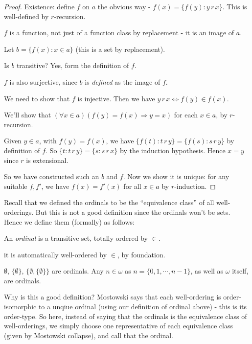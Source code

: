 \documentclass[a4paper]{article}
\begin{document}
\begin{proof}
  Existence: define $f$ on $a$ the obvious way - $f(x) = \{f(y): y\,r\,x\}$. This is well-defined by $r$-recursion.

  \note $f$ is a function, not just of a function class by replacement - it is an image of $a$.

  Let $b = \{f(x): x\in a\}$ (this is a set by replacement).

  Is $b$ transitive? Yes, form the definition of $f$.

  $f$ is also surjective, since $b$ is \emph{defined} as the image of $f$.

  We need to show that $f$ is injective. Then we have $y\, r\, x \Leftrightarrow f(y) \in f(x)$.

  We'll show that $(\forall x\in a)(f(y) = f(x) \Rightarrow  y = x)$ for each $x\in a$, by $r$-recursion.

  Given $y\in a$, with $f(y) = f(x)$, we have $\{f(t): t\,r\, y\} = \{f(s): s\,r\,y\}$ by definition of $f$. So $\{t: t\,r \, y\}=\{s: s\,r \, x\}$ by the induction hypothesis. Hence $x = y$ since $r$ is extensional.

  So we have constructed such an $b$ and $f$. Now we show it is unique: for any suitable $f, f'$, we have $f(x) = f'(x)$ for all $x\in a$ by $r$-induction.
\end{proof}

Recall that we defined the ordinals to be the ``equivalence class'' of all well-orderings. But this is not a good definition since the ordinals won't be sets. Hence we define them (formally) as follows:
\begin{defi}[Ordinal]
  An \emph{ordinal} is a transitive set, totally ordered by $\in$.
\end{defi}
\note it is automatically well-ordered by $\in$, by foundation.

\begin{eg}
  $\emptyset$, $\{\emptyset\}$, $\{\emptyset, \{\emptyset\}\}$ are ordinals. Any $n\in \omega$ as $n = \{0, 1, \cdots, n - 1\}$, as well as $\omega$ itself, are ordinals.
\end{eg}

Why is this a good definition? Mostowski says that each well-ordering is order-isomorphic to a unqiue ordinal (using our definition of ordinal above) - this is its order-type. So here, instead of saying that the ordinals is the equivalence class of well-orderings, we simply choose one representative of each equivalence class (given by Mostowski collapse), and call that the ordinal.
\end{document}
